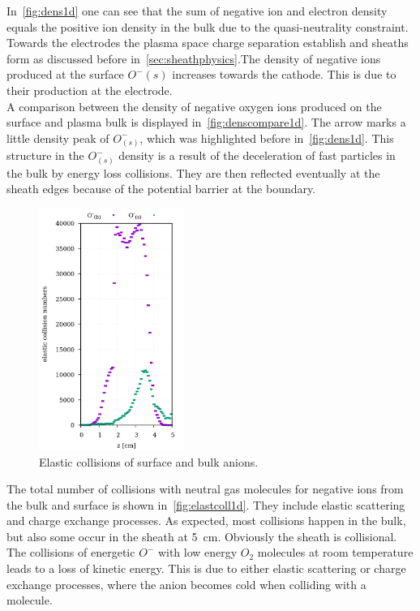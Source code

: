         In~\autoref{fig:dens1d} one can see that the sum of negative ion and electron density equals the positive ion density in the bulk due to the quasi-neutrality constraint. Towards the electrodes the plasma space charge separation establish and sheaths form as discussed before  in~\autoref{sec:sheathphysics}.The density of negative ions produced at the surface $O^{-}{(s)}$ increases towards the cathode. This is due to their production at the electrode.\\
        A comparison between the density of negative oxygen ions produced on the surface and plasma bulk is displayed in~\autoref{fig:denscompare1d}. The arrow marks a little density peak of $O^{-}_{(s)}$, which was highlighted before in~\autoref{fig:dens1d}. This structure in the $O^{-}_{(s)}$ density is a result of the deceleration of fast particles in the bulk by energy loss collisions. They are then reflected eventually at the sheath edges because of the potential barrier at the boundary.\\
%        
        \vspace*{-0.6cm}
        \begin{figure}
            \centering
            \includegraphics[width=0.42\textwidth]{figures/results/1D/elastcoll.png}
            \caption[Elastic collisions for surface and bulk anions]{%
                Elastic collisions of surface and bulk anions.}
            \label{fig:elastcoll1d}
        \end{figure}
%        
         The total number of collisions with neutral gas molecules for negative ions from the bulk and surface is shown in~\autoref{fig:elastcoll1d}. They include elastic scattering and charge exchange processes. As expected, most collisions happen in the bulk, but also some occur in the sheath at \SI{5}{cm}. Obviously the sheath is collisional. The collisions of energetic $O^{-}$ with low energy $O_{2}$ molecules at room temperature leads to a loss of kinetic energy. This is due to either elastic scattering or charge exchange processes, where the anion becomes cold when colliding with a molecule.\\
